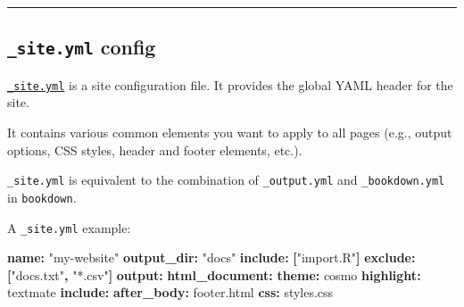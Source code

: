 \documentclass[
  a4paper,
  twoside,
  openright]{book}
\newenvironment{Shaded}{\begin{snugshade}}{\end{snugshade}}
\newcommand{\AttributeTok}[1]{\textcolor[rgb]{0.13,0.29,0.53}{#1}}
\newcommand{\FunctionTok}[1]{\textcolor[rgb]{0.13,0.29,0.53}{\textbf{#1}}}
\newcommand{\KeywordTok}[1]{\textcolor[rgb]{0.13,0.29,0.53}{\textbf{#1}}}
\newcommand{\StringTok}[1]{\textcolor[rgb]{0.31,0.60,0.02}{#1}}
\theoremstyle{definition}
\theoremstyle{definition}
\theoremstyle{definition}
\theoremstyle{definition}
\theoremstyle{remark}
\begin{document}
\begin{center}\rule{0.5\linewidth}{0.5pt}\end{center}

\subsection*{\texorpdfstring{\texttt{\_site.yml} config}{\_site.yml config}}\label{site.yml-config}

\href{https://bookdown.org/yihui/rmarkdown/rmarkdown-site.html\#site-configuration}{\texttt{\_site.yml}} is a site configuration file. It provides the {global YAML header for the site}.

It contains various common elements you want to apply to all pages (e.g., output options, CSS styles, header and footer elements, etc.).

\texttt{\_site.yml} is equivalent to the combination of \texttt{\_output.yml} and \texttt{\_bookdown.yml} in \texttt{bookdown}.

A \texttt{\_site.yml} example:

\begin{Shaded}
\begin{Highlighting}[]
\FunctionTok{name}\KeywordTok{:}\AttributeTok{ }\StringTok{"my{-}website"}
\FunctionTok{output\_dir}\KeywordTok{:}\AttributeTok{ }\StringTok{"docs"}
\FunctionTok{include}\KeywordTok{:}\AttributeTok{ }\KeywordTok{[}\StringTok{"import.R"}\KeywordTok{]}
\FunctionTok{exclude}\KeywordTok{:}\AttributeTok{ }\KeywordTok{[}\StringTok{"docs.txt"}\KeywordTok{,}\AttributeTok{ }\StringTok{"*.csv"}\KeywordTok{]}
\FunctionTok{output}\KeywordTok{:}
\AttributeTok{  }\FunctionTok{html\_document}\KeywordTok{:}
\AttributeTok{    }\FunctionTok{theme}\KeywordTok{:}\AttributeTok{ cosmo}
\AttributeTok{    }\FunctionTok{highlight}\KeywordTok{:}\AttributeTok{ textmate}
\AttributeTok{    }\FunctionTok{include}\KeywordTok{:}
\AttributeTok{      }\FunctionTok{after\_body}\KeywordTok{:}\AttributeTok{ footer.html}
\AttributeTok{    }\FunctionTok{css}\KeywordTok{:}\AttributeTok{ styles.css}
\end{Highlighting}
\end{Shaded}
\end{document}
